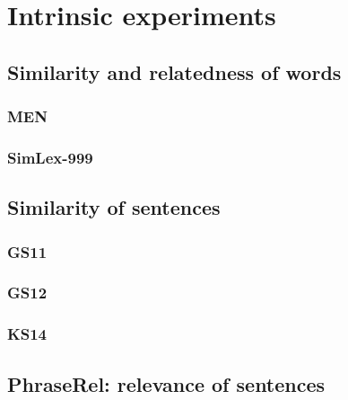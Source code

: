
\chapter{Intrinsic experiments}
\label{cha:experiments}

\section{Similarity and relatedness of words}
\label{sec:lexical}

\subsection{MEN}
\label{sec:men}

\subsection{SimLex-999}
\label{sec:simlex-999}

\section{Similarity of sentences}
\label{sec:sentential}

\subsection{GS11}
\label{sec:gs11}

\subsection{GS12}
\label{sec:gs12}

\subsection{KS14}
\label{sec:ks14}

\section{PhraseRel: relevance of sentences}
\label{sec:sentential-relevance}

